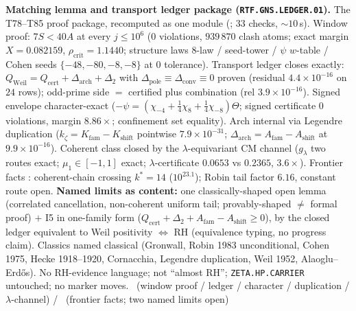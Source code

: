 \documentclass[11pt,a4paper]{article}
\theoremstyle{definition}
\begin{document}
\par\smallskip\noindent\textbf{Matching lemma and transport ledger package
(\texttt{RTF.GNS.LEDGER.01}).}
The T78--T85 proof package, recomputed as one module
(; $33$ checks, $\sim10$\,s).
Window proof: $7S<40A$ at every $j\le10^6$ ($0$ violations, $939\,870$ clash
atoms; exact margin $X=0.082159$, $\rho_{\mathrm{crit}}=1.1440$; structure laws
$8$-law / seed-tower / $\psi$ $w$-table / Cohen seeds $\{-48,-80,-8,-8\}$ at
$0$ tolerance). Transport ledger closes exactly:
$Q_{\mathrm{Weil}}=Q_{\mathrm{cert}}+\Delta_{\mathrm{arch}}+\Delta_2$ with
$\Delta_{\mathrm{pole}}\equiv\Delta_{\mathrm{conv}}\equiv0$ proven (residual
$4.4\times10^{-16}$ on $24$ rows); odd-prime side $=$ certified plus
combination (rel $3.9\times10^{-16}$). Signed envelope character-exact
($-\psi=(\chi_{-4}+\tfrac14\chi_8+\tfrac14\chi_{-8})\Theta$; signed
certificate $0$ violations, margin $8.86\times$; confinement set equality).
Arch internal via Legendre duplication
($k_\zeta=K_{\mathrm{fam}}-K_{\mathrm{shift}}$ pointwise $7.9\times10^{-31}$;
$\Delta_{\mathrm{arch}}=A_{\mathrm{fam}}-A_{\mathrm{shift}}$ at
$9.9\times10^{-16}$). Coherent class closed by the $\lambda$-equivariant CM
channel ($g_\lambda$ two routes exact; $\mu_1\in[-1,1]$ exact;
$\lambda$-certificate $0.0653$ vs $0.2365$, $3.6\times$).
Frontier facts \mC: coherent-chain crossing $k^*=14$ ($10^{23.1}$); Robin tail
factor $6.16$, constant route open. \textbf{Named limits as content:} one
classically-shaped open lemma (correlated cancellation, non-coherent uniform
tail; provably-shaped $\neq$ formal proof) $+$ I5 in one-family form
($Q_{\mathrm{cert}}+\Delta_2+A_{\mathrm{fam}}-A_{\mathrm{shift}}\ge0$),
by the closed ledger equivalent to Weil positivity $\Longleftrightarrow$ RH
(equivalence typing, no progress claim). Classics named classical (Gronwall,
Robin 1983 unconditional, Cohen 1975, Hecke 1918--1920, Cornacchia, Legendre
duplication, Weil 1952, Alaoglu--Erd\H{o}s). No RH-evidence language;
not ``almost RH''; \texttt{ZETA.HP.CARRIER} untouched; no marker moves.
\mE\ (window proof / ledger / character / duplication / $\lambda$-channel) /
\mC\ (frontier facts; two named limits open)
\par\smallskip
\end{document}
